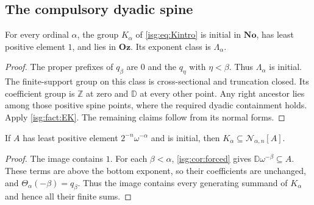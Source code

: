 \documentclass[11pt]{article}
\theoremstyle{definition}
\theoremstyle{remark}
\newcommand{\No}{\ensuremath{\mathbf{No}}}
\newcommand{\Oz}{\ensuremath{\mathbf{Oz}}}
\newcommand{\Z}{\mathbb{Z}}
\newcommand{\D}{\mathbb{D}}
\newcommand{\Rect}{\mathcal{N}_{\alpha,n}}
\newcommand{\tht}{\Theta_{\alpha}}
\begin{document}
\subsection{The compulsory dyadic spine}
\begin{lemma}\label{isg:lem:K}
For every ordinal $\alpha$, the group $K_\alpha$ of
\eqref{isg:eq:Kintro} is initial in $\No$, has least positive element $1$,
and lies in $\Oz$. Its exponent class is $\Lambda_\alpha$.
\end{lemma}
\begin{proof}
The proper prefixes of $q_\beta$ are $0$ and the $q_\eta$ with
$\eta<\beta$. Thus $\Lambda_\alpha$ is initial. The finite-support
group on this class is cross-sectional and truncation closed. Its
coefficient group is $\Z$ at zero and $\D$ at every other point.
Any right ancestor lies among those positive spine points, where the
required dyadic containment holds. Apply \cref{isg:fact:EK}. The remaining
claims follow from its normal forms.
\end{proof}

\begin{proposition}\label{isg:prop:Knecessary}
If $A$ has least positive element $2^{-n}\omega^{-\alpha}$ and is
initial, then $K_\alpha\subseteq\Rect[A]$.
\end{proposition}
\begin{proof}
The image contains $1$. For each $\beta<\alpha$, \cref{isg:cor:forced}
gives $\D\omega^{-\beta}\subseteq A$. These terms are above the
bottom exponent, so their coefficients are unchanged, and
$\tht(-\beta)=q_\beta$. Thus the image contains every generating
summand of $K_\alpha$ and hence all their finite sums.
\end{proof}
\end{document}
